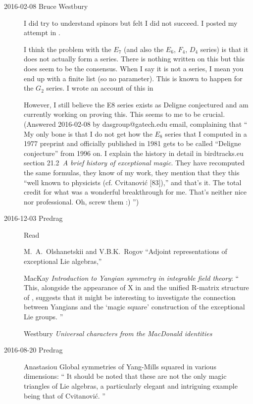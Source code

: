 \begin{description}
\item[2016-02-08 Bruce Westbury]
I did try to understand spinors but felt I did not succeed. I posted my
attempt in .

I think the problem with the $E_7$ (and also the $E_6$, $F_4$, $D_4$ series) is that
it does not actually form a series. There is nothing written on this but
this does seem to be the consensus. When I say it is not a series, I
mean you end up with a finite list (so no parameter). This is known to
happen for the $G_2$ series. I wrote an account of this in

However, I still believe the E8 series exists as Deligne conjectured and
am currently working on proving this. This seems to me to be crucial.
\\
(Answered 2016-02-08 by dasgroup@gatech.edu email,
complaining that ``
My only bone is that I do not get how the $E_8$ series that I computed in
a 1977 preprint and officially published in 1981 gets to be called
``Deligne conjecture'' from 1996 on. I explain the history in detail in
birdtracks.eu section 21.2~{\em A brief history of exceptional magic}. They
have recomputed the same formulas, they know of my work, they mention
that they this ``well known to physicists (cf. Cvitanovi\'c [83]),'' and
that's it. The total credit for what was a wonderful breakthrough for me.
That's neither nice nor professional. Oh, screw them :)
'')


\item[2016-12-03 Predrag]
Read

M.~A.~Olshanetskii and V.B.K.~Rogov
``Adjoint representations of exceptional Lie algebras,''

MacKay
{\em Introduction to {Yangian} symmetry in integrable field theory}:
``
This, alongside the appearance of X in  and the
unified R-matrix structure of , suggests that it might be
interesting to investigate the connection between Yangians and the `magic
square' construction of the exceptional Lie groups.
''

Westbury
{\em Universal characters from the {MacDonald} identities}


\item[2016-08-20 Predrag]
Anastasiou \etal{}
{Global symmetries of {Yang-Mills} squared in various dimensions}: ``
It should be noted that these are not the only magic triangles of Lie
algebras, a particularly elegant and intriguing example being that of
Cvitanovi\'c.
''


\end{description}
